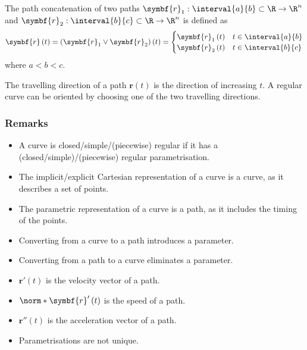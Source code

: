 \documentclass{article}
\begin{document}
\begin{definition}
    The path concatenation of two paths \(\symbf{r}_1 : \interval{a}{b} \subset \R \to \R^n\)
    and \(\symbf{r}_2 : \interval{b}{c} \subset \R \to \R^n\) is defined as
    \begin{equation*}
        \symbf{r}\left( t \right) = \left( \symbf{r}_1 \vee \symbf{r}_2 \right)\left( t \right) =
        \begin{cases}
            \symbf{r}_1\left( t \right) & t \in \interval{a}{b} \\
            \symbf{r}_2\left( t \right) & t \in \interval{b}{c}
        \end{cases}
    \end{equation*}
    where \(a < b < c\).
\end{definition}
\begin{definition}
    The travelling direction of a path \(\symbf{r}\left( t \right)\) is
    the direction of increasing \(t\).
    A regular curve can be oriented by choosing one of the two
    travelling directions.
\end{definition}
\subsubsection{Remarks}
\begin{itemize}
    \item A curve is closed/simple/(piecewise) regular if it has a
          (closed/simple)/(piecewise) regular parametrisation.
    \item The implicit/explicit Cartesian representation of a curve is
          a curve, as it describes a set of points.
    \item The parametric representation of a curve is a path, as it
          includes the timing of the points.
    \item Converting from a curve to a path introduces a parameter.
    \item Converting from a path to a curve eliminates a parameter.
    \item \(\symbf{r}'\left( t \right)\) is the velocity vector of a path.
    \item \(\norm*{\symbf{r}'\left( t \right)}\) is the speed of a path.
    \item \(\symbf{r}''\left( t \right)\) is the acceleration vector of a path.
    \item Parametrisations are not unique.
\end{itemize}
\end{document}
